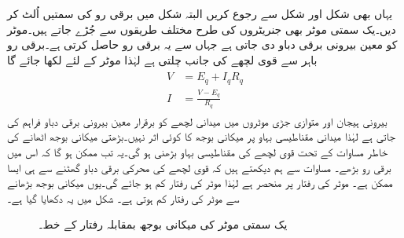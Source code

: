 یہاں بھی شکل   اور شکل   سے رجوع کریں البتہ شکل میں برقی رو کی سمتیں اُلٹ کر دیں۔یک سمتی موٹر بھی جنریٹروں کی طرح مختلف طریقوں سے جُڑے جاتے ہیں۔موٹر کو معین بیرونی برقی دباو دی جاتی ہے جہاں سے یہ برقی رو حاصل کرتی ہے۔برقی رو باہر سے قوی لچھے کی جانب چلتی ہے لہٰذا موٹر کے لئے لکھا جائے گا
\begin{gather}
\begin{aligned}\label{مساوات_یکسمتی_دباو_رو_قوی_سلسلہ_وار}
V&=E_q+I_q R_q\\
I&=\frac{V-E_q}{R_q}
\end{aligned}
\end{gather}
بیرونی ہیجان اور متوازی جڑی موٹروں میں میدانی لچھے کو برقرار معین بیرونی برقی دباو فراہم کی جاتی ہے لہٰذا میدانی مقناطیسی بہاو پر میکانی بوجھ کا کوئی اثر نہیں۔بڑھتی میکانی بوجھ اٹھانے کی خاطر مساوات    کے تحت قوی لچھے کی مقناطیسی بہاو بڑھنی ہو گی۔یہ تب ممکن ہو گا کہ اس میں برقی رو بڑھے۔ مساوات  سے ہم دیکھتے ہیں کہ قوی لچھے کی محرکی برقی دباو   گھٹنے سے ہی ایسا ممکن ہے۔ موٹر کی رفتار پر منحصر ہے لہٰذا موٹر کی رفتار کم ہو جائے گی۔یوں میکانی بوجھ بڑھانے سے موٹر کی رفتار کم ہوتی ہے۔ شکل    میں یہ دکھایا گیا ہے۔
\begin{figure}
\centering
\newcommand\DrawControl[3]{
  node[#2,circle,fill=#2,inner sep=2pt,label={above:$#1$},label={[black]below:{\footnotesize#3}}] at #1 {}
}
%
\caption{یک سمتی موٹر کی میکانی بوجھ بمقابلہ رفتار کے خط۔}
\label{شکل_یکسمتی_موٹر_رفتار_بالمقابل_بار}
\end{figure}


